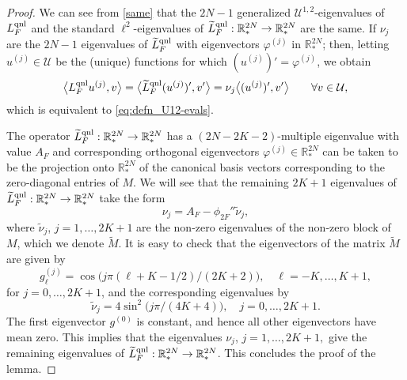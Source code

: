 \documentclass[12pt,reqno]{amsart}
\begin{document}
\begin{proof}
We can see from \eqref{same} that the $2N-1$
generalized ${\mathcal{U}}^{1,2}$-eigenvalues of ${L^{{\rm qnl}}_F}$ and the standard
  $\ell^2$-eigenvalues of ${\widetilde{L}^{{\rm qnl}}_F}:{\mathbb{R}}^{2N}_*\to {\mathbb{R}}^{2N}_*$ are the same.
  If $\nu_j$ are the $2N-1$ eigenvalues of ${\widetilde{L}^{{\rm qnl}}_F}$ with eigenvectors $\varphi^{(j)}$ in ${\mathbb{R}}^{2N}_*$; then, letting
  $u^{(j)} \in {\mathcal{U}}$ be the (unique) functions for which $(u^{(j)})'
  = \varphi^{(j)}$, we obtain
  \begin{displaymath}
    \big{\langle} {L^{{\rm qnl}}_F} u^{(j)}, v \big{\rangle} = \big{\langle} {\widetilde{L}^{{\rm qnl}}_F} (u^{(j)})', v' \big{\rangle} =
     \nu_j \big{\langle} (u^{(j)})', v'\big{\rangle} \qquad \forall v\in{\mathcal{U}},
  \end{displaymath}
  which is equivalent to \eqref{eq:defn_U12-evals}.

  The operator ${\widetilde{L}^{{\rm qnl}}_F}:{\mathbb{R}}^{2N}_*\to {\mathbb{R}}^{2N}_*$ has a $(2N -
  2K-2)$-multiple eigenvalue with value $A_F$ and corresponding
  orthogonal eigenvectors $\varphi^{(j)}\in{\mathbb{R}}^{2N}_*$ can be taken to
  be the projection onto ${\mathbb{R}}^{2N}_*$ of the canonical basis vectors
  corresponding to the zero-diagonal entries of $M.$
  We will see that the remaining $2K+1$ eigenvalues of ${\widetilde{L}^{{\rm qnl}}_F}:{\mathbb{R}}^{2N}_*\to
  {\mathbb{R}}^{2N}_*$ take the form
  \begin{displaymath}
    \nu_j = A_F - \phi_{2F}'' \tilde{\nu}_j,
  \end{displaymath}
  where $\tilde{\nu}_j$, $j = 1, \dots, 2K+1$ are the non-zero
  eigenvalues of the non-zero block of $M$, which we denote
  $\widetilde{M}$. It is easy to check that the eigenvectors of the
  matrix $\widetilde{M}$ are given by
  \begin{displaymath}
    g_\ell^{(j)} = \cos\big( j \pi (\ell + K - 1/2) / (2K+2) \big),
    \quad \ell = -K, \dots, K+1,
  \end{displaymath}
  for $j = 0, \dots, 2K+1$, and the corresponding eigenvalues by
  \begin{displaymath}
    \tilde\nu_j = 4 \sin^2 \big( j \pi / (4K+4) \big),
    \quad j = 0, \dots, 2K+1.
  \end{displaymath}
  The first eigenvector $g^{(0)}$ is constant, and hence all other
  eigenvectors have mean zero. This implies that the eigenvalues
  $\nu_j$, $j = 1, \dots, 2K+1,$ give the remaining eigenvalues of
  ${\widetilde{L}^{{\rm qnl}}_F}:{\mathbb{R}}^{2N}_*\to {\mathbb{R}}^{2N}_*$. This concludes the proof of the
  lemma.
\end{proof}
\end{document}
